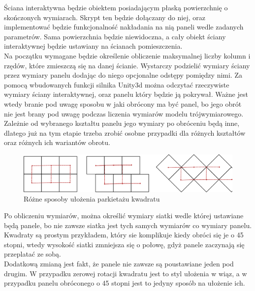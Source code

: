 \documentclass{article} %
\begin{document}
            Ściana interaktywna będzie obiektem posiadającym płaską powierzchnię o skończonych wymiarach. Skrypt ten będzie dołączany do niej, oraz implementować będzie funkcjonalność nakładania na nią paneli wedle zadanych parametrów. Sama powierzchnia będzie niewidoczna, a cały obiekt ściany interaktywnej będzie ustawiany na ścianach pomieszczenia.
            \\
            
            Na początku wymagane będzie określenie obliczenie maksymalnej liczby kolumn i rzędów, które zmieszczą się na danej ścianie. Wystarczy podzielić wymiary ściany przez wymiary panelu dodając do niego opcjonalne odstępy pomiędzy nimi. Za pomocą wbudowanych funkcji silnika Unity3d można odczytać rzeczywiste wymiary ściany interaktywnej, oraz panelu który będzie ją pokrywał. Ważne jest wtedy branie pod uwagę sposobu w jaki obrócony ma być panel, bo jego obrót nie jest brany pod uwagę podczas liczenia wymiarów modelu trójwymiarowego. Zależnie od wybranego kształtu panelu jego wymiary po obróceniu będą inne, dlatego już na tym etapie trzeba zrobić osobne przypadki dla różnych kształtów oraz różnych ich wariantów obrotu.
            \\
            
            \begin{figure}[h]
            \centering
            \includegraphics[scale=0.2,keepaspectratio=true]{images/diagrams/panel_tiling_square.png}
            \caption{Różne sposoby ułożenia parkietażu kwadratu}
            \end{figure}

            
            Po obliczeniu wymiarów, można określić wymiary siatki wedle której ustawiane będą panele, bo nie zawsze siatka jest tych samych wymiarów co wymiary panelu. Kwadraty są prostym przykładem, który sie komplikuje kiedy obróci się je o 45 stopni, wtedy wysokość siatki zmniejsza się o połowę, gdyż panele zaczynają się przeplatać ze sobą.
            \\
            
            Dodatkową zmianą jest fakt, że panele nie zawsze są poustawiane jeden pod drugim. W przypadku zerowej rotacji kwadratu jest to styl ułożenia w wiąz, a w przypadku panelu obróconego o 45 stopni jest to jedyny sposób na ułożenie ich.
            \\
            
\end{document}
